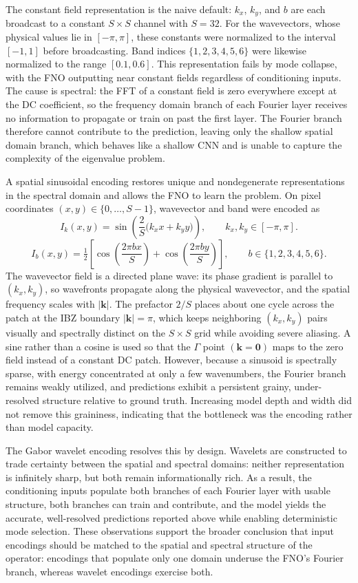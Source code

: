 \documentclass[preprint,review,12pt,numafflabel]{elsarticle}
\begin{document}
The constant field representation is the naive default: $k_x$, $k_y$, and $b$ are each broadcast to a constant $S\times S$ channel with $S = 32$. For the wavevectors, whose physical values lie in $[-\pi,\pi]$, these constants were normalized to the interval $[-1,1]$ before broadcasting. Band indices $\{1,2,3,4,5,6\}$ were likewise normalized to the range $[0.1,0.6]$. This representation fails by mode collapse, with the FNO outputting near constant fields regardless of conditioning inputs. The cause is spectral: the FFT of a constant field is zero everywhere except at the DC coefficient, so the frequency domain branch of each Fourier layer receives no information to propagate or train on past the first layer. The Fourier branch therefore cannot contribute to the prediction, leaving only the shallow spatial domain branch, which behaves like a shallow CNN and is unable to capture the complexity of the eigenvalue problem.

A spatial sinusoidal encoding restores unique and nondegenerate representations in the spectral domain and allows the FNO to learn the problem. On pixel coordinates $(x,y)\in\{0,\ldots,S-1\}$, wavevector and band were encoded as
\[
I_k(x,y)=\sin\!\left(\frac{2}{S}\bigl(k_x x+k_y y\bigr)\right),\qquad k_x,k_y\in[-\pi,\pi].
\]
\[
I_b(x,y)=\tfrac{1}{2}\left[\cos\!\left(\frac{2\pi b x}{S}\right)+\cos\!\left(\frac{2\pi b y}{S}\right)\right],\qquad b\in\{1,2,3,4,5,6\}.
\]
The wavevector field is a directed plane wave: its phase gradient is parallel to $(k_x,k_y)$, so wavefronts propagate along the physical wavevector, and the spatial frequency scales with $|\mathbf{k}|$. The prefactor $2/S$ places about one cycle across the patch at the IBZ boundary $|\mathbf{k}|=\pi$, which keeps neighboring $(k_x,k_y)$ pairs visually and spectrally distinct on the $S\times S$ grid while avoiding severe aliasing. A sine rather than a cosine is used so that the $\Gamma$ point $(\mathbf{k}=\mathbf{0})$ maps to the zero field instead of a constant DC patch.
However, because a sinusoid is spectrally sparse, with energy concentrated at only a few wavenumbers, the Fourier branch remains weakly utilized, and predictions exhibit a persistent grainy, under-resolved structure relative to ground truth. Increasing model depth and width did not remove this graininess, indicating that the bottleneck was the encoding rather than model capacity.

The Gabor wavelet encoding resolves this by design. Wavelets are constructed to trade certainty between the spatial and spectral domains: neither representation is infinitely sharp, but both remain informationally rich. As a result, the conditioning inputs populate both branches of each Fourier layer with usable structure, both branches can train and contribute, and the model yields the accurate, well-resolved predictions reported above while enabling deterministic mode selection. These observations support the broader conclusion that input encodings should be matched to the spatial and spectral structure of the operator: encodings that populate only one domain underuse the FNO's Fourier branch, whereas wavelet encodings exercise both.
\end{document}
